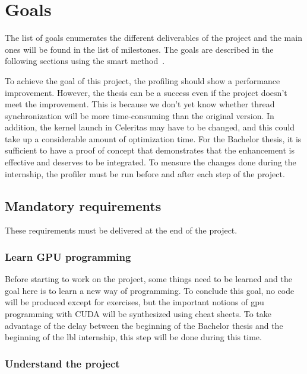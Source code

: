 \chapter{Goals}
\label{spec:ch:goals}

The list of goals enumerates the different deliverables of the project and the main ones will be found in the list of milestones.
The goals are described in the following sections using the \acrshort{smart} method~\cite{how_to_write_smart_goals_kat_boogaard}.

To achieve the goal of this project, the profiling should show a performance improvement.
However, the thesis can be a success even if the project doesn't meet the improvement.
This is because we don't yet know whether thread synchronization will be more time-consuming than the original version.
In addition, the kernel launch in Celeritas may have to be changed, and this could take up a considerable amount of optimization time.
For the Bachelor thesis, it is sufficient to have a proof of concept that demonstrates that the enhancement is effective and deserves to be integrated.
To measure the changes done during the internship, the profiler must be run before and after each step of the project.

\section{Mandatory requirements}
\label{spec:ch:goals:mandatory-requirements}

These requirements must be delivered at the end of the project.


\subsection{Learn GPU programming}
\label{spec:ch:goals:mandatory-requirements:learn-gpu-programming}

Before starting to work on the project, some things need to be learned and the goal here is to learn a new way of programming.
To conclude this goal, no code will be produced except for exercises, but the important notions of \acrshort{gpu} programming with CUDA will be synthesized using cheat sheets.
To take advantage of the delay between the beginning of the Bachelor thesis and the beginning of the \acrshort{lbl} internship, this step will be done during this time.


\subsection{Understand the project}
\label{spec:ch:goals:mandatory-requirements:understand-the-project}

